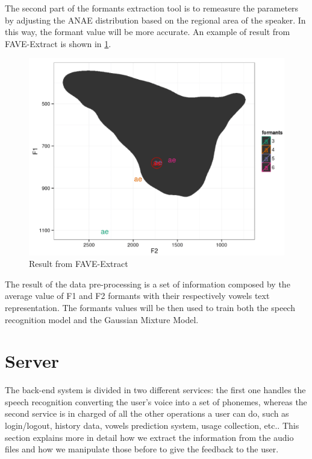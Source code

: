 \noindent The second part of the formants extraction tool is to remeasure the parameters by adjusting the ANAE distribution based on the regional area of the speaker. In this way, the formant value will be more accurate. An example of result from FAVE-Extract is shown in \ref{fig:fave-extract_example}.

\begin{figure}[!ht]
	\centering
	\includegraphics[scale=0.5]{Figures/fave-extract_example.png}
	\caption{Result from FAVE-Extract}
	\label{fig:fave-extract_example}
\end{figure}

\noindent The result of the data pre-processing is a set of information composed by the average value of F1 and F2 formants with their respectively vowels text representation. The formants values will be then used to train both the speech recognition model and the Gaussian Mixture Model.

\section{Server}
\label{sec:server}

The back-end system is divided in two different services: the first one handles the speech recognition converting the user's voice into a set of phonemes, whereas the second service is in charged of all the other operations a user can do, such as login/logout, history data, vowels prediction system, usage collection, etc.. This section explains more in detail how we extract the information from the audio files and how we manipulate those before to give the feedback to the user.

